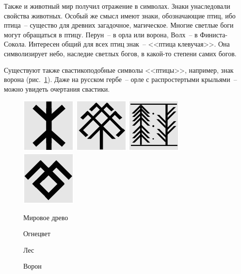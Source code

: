 \documentclass[pscyr,chapters]{hedwork}
\begin{document}
  Также и животный мир получил отражение в символах. Знаки унаследовали свойства
  животных. Особый же смысл имеют знаки, обозначающие птиц, ибо птица~-- существо
  для древних загадочное, магическое. Многие светлые боги могут обращаться в
  птицу. Перун~-- в орла или ворона, Волх~-- в Финиста-Сокола. Интересен общий
  для всех птиц знак~-- <<птица клевучая>>. Она символизирует небо, наследие
  светлых богов, в какой-то степени самих богов.

  Существуют также свастикоподобные символы <<птицы>>, например, знак ворона
  (рис.~\ref{pic-bird}). Даже на русском гербе~-- орле с распростертыми
  крыльями~-- можно увидеть очертания свастики.

  \begin{figure}[ht]
    \center
    \includegraphics{sl_5_5} \hspace{1em}
    \includegraphics{sl_5_6} \hspace{1em}
    \includegraphics{sl_5_7} \hspace{1em}
    \includegraphics{sl_5_8} \\
    \parbox{6em}{\caption{Мировое древо}\label{pic-world_tree}} \hspace{1ex}
    \parbox{6em}{\caption{Огнецвет}\label{pic-fire_flower}} \hspace{1ex}
    \parbox{6em}{\caption{Лес}\label{pic-forest}} \hspace{1ex}
    \parbox{6em}{\caption{Ворон}\label{pic-bird}}
  \end{figure}
\end{document}
